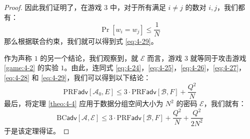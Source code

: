 \begin{proof}
因此我们证明了，在游戏 $3$ 中，对于所有满足 $i\neq j$ 的数对 $i,j$，我们都有：
\[
\Pr[w_i=w_j]
\leq
\frac{1}{N}
\]
那么根据联合约束，我们就可以得到式 \ref{eq:4-29}。

作为声称 $1$ 的另一个结论，我们观察到，就 $\mathcal{E}$ 而言，游戏 $3$ 就等同于攻击游戏 \ref{game:4-2} 的实验 $1$。由此，连同式 \ref{eq:4-24}，\ref{eq:4-25}，\ref{eq:4-26}，\ref{eq:4-27}，\ref{eq:4-28} 和 \ref{eq:4-29}，我们可以得到以下结论：
\[
\mathrm{PRF}\mathsf{adv}[\mathcal{A}_0,E]
\leq
3\cdot
\mathrm{PRF}\mathsf{adv}[\mathcal{B},F]
+\frac{Q^2}{N}
\]
最后，将定理 \ref{theo:4-4} 应用于数据分组空间大小为 $N^2$ 的密码 $\mathcal{E}$，我们就有：
\[
\mathrm{BC}\mathsf{adv}[\mathcal{A},\mathcal{E}]
\leq
3\cdot
\mathrm{PRF}\mathsf{adv}[\mathcal{B},F]
+\frac{Q^2}{N}
+\frac{Q^2}{2N^2}
\]
于是该定理得证。
\end{proof}